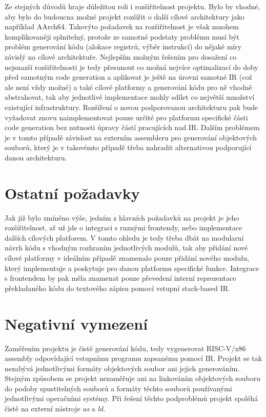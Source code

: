 \documentclass{article}
\def\xxx#1{\textcolor{red!50}{\itshape #1}}
\begin{document}
Ze stejných důvodů hraje důležitou roli i rozšiřitelnost projektu. Bylo by vhodné, aby bylo do budoucna možné projekt rozšířit o další cílové architektury jako například AArch64. Takovýto požadavek na rozšiřitelnost je však mnohem komplikovaněji splnitelný, protože ze samotné podstaty problému musí být problém generování kódu (alokace registrů, výběr instrukcí) do nějaké míry závislý na cílové architektuře. Nejlepším možným řešením pro dosažení co nejsnazší rozšiřitelnosti je tedy přesunout co možná nejvíce optimalizací do doby před samotným code generation a aplikovat je ještě na úrovni samotné IR (což ale není vždy možné) a také cílové platformy a generování kódu pro ně vhodně abstrahovat, tak aby jednotlivé implementace mohly sdílet co největší množství existující infrastruktury. Rozšíření o novou podporovanou architekturu pak bude vyžadovat znovu naimplementovat pouze určité pro platformu specifické části code generation bez nutnosti úpravy částí pracujících nad IR. Dalším problémem je v tomto případě závislost na externím assembleru pro generování objektových souborů, který je v takovémto případě třeba nahradit alternativou podporující danou architekturu.

\section{Ostatní požadavky}

Jak již bylo zmíněno výše, jedním z hlavních požadavků na projekt je jeho rozšiřitelnost, ať už jde o integraci s ruznými frontendy, nebo implementace dalších cílových platforem. V tomto ohledu je tedy třeba dbát na modularní návrh kódu s vhodným rozhraním jednotlivých modulů, tak aby přidání nové cílové platformy v ideálním případě znamenalo pouze přidání nového modulu, který implementuje a poskytuje pro danou platformu specifické funkce. Integrace s frontendem by pak měla znamenat pouze převedení interní reprezentace překladaného kódu do textového zápisu pomocí vstupní stack-based IR.


\section{Negativní vymezení}

Zaměřením projektu je čistě generování kódu, tedy vygenerovat RISC-V/x86 assembly odpovídající vstupnímu programu zapsanému pomocí IR. Projekt se tak nezabývá jednotlivými formáty objektových soubor ani jejich generováním. Stejným způsobem se projekt nezaměřuje ani na linkováním objektových souboru do podoby spustitelných souborů a formáty těchto souborů používanými jednotlivými operačními systémy. Při řešení těchto podproblémů projekt spoléhá čistě na externí nástroje \textit{as} a \textit{ld}.
\end{document}
